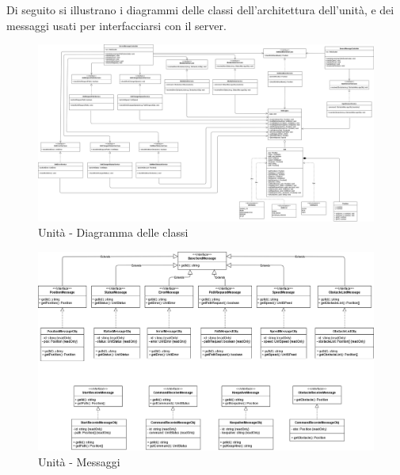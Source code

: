 Di seguito si illustrano i diagrammi delle classi dell'architettura dell'unità, e dei messaggi usati per interfacciarsi con il server.

\begin{landscape}
	\begin{figure}[h!]
		\includegraphics[width=24cm]{img/unit_architettura.png}
		\caption{Unità - Diagramma delle classi}
	\end{figure}
\end{landscape}

\begin{figure}[H]
	\centering
	\includegraphics[width=18cm]{img/unit_messaggi.png}
	\caption{Unità - Messaggi}
\end{figure}